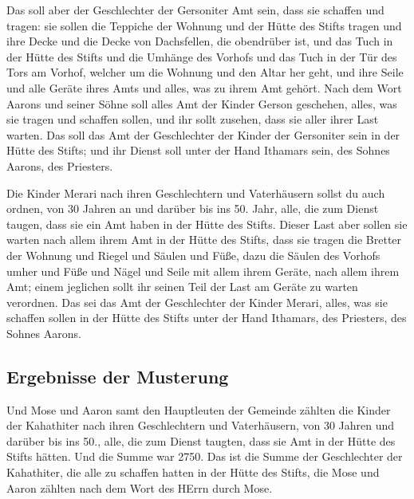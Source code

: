  Das soll aber der Geschlechter der Gersoniter Amt sein,
dass sie schaffen und tragen:  sie sollen die Teppiche
der Wohnung und der Hütte des Stifts tragen und ihre Decke und die Decke
von Dachsfellen, die obendrüber ist, und das Tuch in der Hütte des
Stifts  und die Umhänge des Vorhofs und das Tuch in der
Tür des Tors am Vorhof, welcher um die Wohnung und den Altar her geht,
und ihre Seile und alle Geräte ihres Amts und alles, was zu ihrem Amt
gehört.  Nach dem Wort Aarons und seiner Söhne soll alles
Amt der Kinder Gerson geschehen, alles, was sie tragen und schaffen
sollen, und ihr sollt zusehen, dass sie aller ihrer Last warten.
 Das soll das Amt der Geschlechter der Kinder der
Gersoniter sein in der Hütte des Stifts; und ihr Dienst soll unter der
Hand Ithamars sein, des Sohnes Aarons, des Priesters.

 Die Kinder Merari nach ihren Geschlechtern und
Vaterhäusern sollst du auch ordnen,  von 30 Jahren an und
darüber bis ins 50. Jahr, alle, die zum Dienst taugen, dass sie ein Amt
haben in der Hütte des Stifts.  Dieser Last aber sollen
sie warten nach allem ihrem Amt in der Hütte des Stifts, dass sie tragen
die Bretter der Wohnung und Riegel und Säulen und Füße, 
dazu die Säulen des Vorhofs umher und Füße und Nägel und Seile mit allem
ihrem Geräte, nach allem ihrem Amt; einem jeglichen sollt ihr seinen
Teil der Last am Geräte zu warten verordnen.  Das sei das
Amt der Geschlechter der Kinder Merari, alles, was sie schaffen sollen
in der Hütte des Stifts unter der Hand Ithamars, des Priesters, des
Sohnes Aarons.

\hypertarget{ergebnisse-der-musterung}{%
\subsection{Ergebnisse der Musterung}\label{ergebnisse-der-musterung}}

 Und Mose und Aaron samt den Hauptleuten der Gemeinde
zählten die Kinder der Kahathiter nach ihren Geschlechtern und
Vaterhäusern,  von 30 Jahren und darüber bis ins 50.,
alle, die zum Dienst taugten, dass sie Amt in der Hütte des Stifts
hätten.  Und die Summe war 2750.  Das ist
die Summe der Geschlechter der Kahathiter, die alle zu schaffen hatten
in der Hütte des Stifts, die Mose und Aaron zählten nach dem Wort des
HErrn durch Mose.

